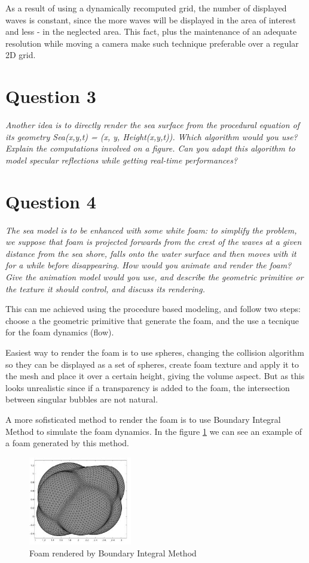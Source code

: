\documentclass{report}
\begin{document}
As a result of using a dynamically recomputed grid, the number of
displayed waves is constant, since the more waves will be displayed in the
area of interest and less - in the neglected area. This fact, plus the
maintenance of an adequate resolution while moving a camera make such
technique preferable over a regular 2D grid.

\section{Question 3}

\emph{Another idea is to directly render the sea surface from the procedural equation of its
geometry Sea(x,y,t) = (x, y, Height(x,y,t)). Which algorithm would you use? Explain the
computations involved on a figure. Can you adapt this algorithm to model specular
reflections while getting real-time performances?}

\section{Question 4}

\emph{The sea model is to be enhanced with some white foam: to simplify the problem, we
suppose that foam is projected forwards from the crest of the waves at a given distance from
the sea shore, falls onto the water surface and then moves with it for a while before
disappearing. How would you animate and render the foam? Give the animation model would
you use, and describe the geometric primitive or the texture it should control, and discuss its
rendering.}

This can me achieved using the procedure based modeling, and follow two steps: choose a the geometric primitive that generate the foam, and the use a tecnique for the foam dynamics (flow). 

Easiest way to render the foam is to use spheres, changing the collision algorithm so they can be displayed as a set of spheres, create foam texture and apply it to the mesh and place it over a certain height, giving the volume aspect.
But as this looks unrealistic since if a transparency is added to the foam, the intersection between singular bubbles are not natural. 

A more sofisticated method to render the foam is to use Boundary Integral Method to simulate the foam dynamics\cite{bim}. In the figure \ref{fig:dim-foam} we can see an example of a foam generated by this method.

\begin{figure}[H]
\centering
\includegraphics[width=0.4\textwidth]{image/dim01.png}
\caption{Foam rendered by Boundary Integral Method}
\label{fig:dim-foam}
\end{figure}
\end{document}

